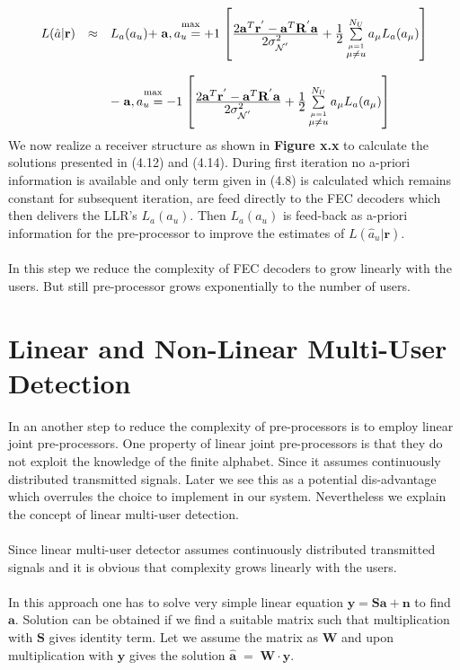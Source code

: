\begin{eqnarray}
\begin{array}{lll}
L(\hat{a}\vert \mathrm{\mathbf{r}})&\approx& L_a(a_u)
+\stackrel{\mathrm{max}}{\mathrm{\mathbf{a}},a_u=+1}\left[ \frac{\hbox{$2\mathrm{\mathbf{a}}^T\mathrm{\mathbf{r}}^{'}-\mathrm{\mathbf{a}}^T\mathrm{\mathbf{R}}^{'}\mathrm{\mathbf{a}}$}}{\hbox{$2\sigma^2_{\mathcal{N}^{'}}$}}+\frac{\hbox{$1$}}{\hbox{$2$}} \sum\limits_{\stackrel{\mu=1}{\mu \ne u}}^{N_U}a_{\mu}L_a(a_\mu) \right] \\ \\
&&-\stackrel{\mathrm{max}}{\mathrm{\mathbf{a}},a_u=-1}\left[ \frac{\hbox{$2\mathrm{\mathbf{a}}^T\mathrm{\mathbf{r}}^{'}-\mathrm{\mathbf{a}}^T\mathrm{\mathbf{R}}^{'}\mathrm{\mathbf{a}}$}}{\hbox{$2\sigma^2_{\mathcal{N}^{'}}$}}+\frac{\hbox{$1$}}{\hbox{$2$}} \sum\limits_{\stackrel{\mu=1}{\mu \ne u}}^{N_U}a_{\mu}L_a(a_\mu) \right]
\end{array}
\end{eqnarray}
We now realize a receiver structure as shown in \textbf{Figure x.x} to calculate the solutions presented in (4.12) and (4.14). During first iteration no a-priori information is available and only term given in (4.8) is calculated which remains constant for subsequent iteration, are feed directly to the FEC decoders which then delivers the LLR's $L_a(a_u)$. Then $L_a(a_u)$ is feed-back as a-priori information for the pre-processor to improve the estimates of $L(\hat{a}_u\vert \mathrm{\mathbf{r}})$. \\ \\
In this step we reduce the complexity of FEC decoders to grow linearly with the users. But still pre-processor grows exponentially to the number of users.
\section{Linear and Non-Linear Multi-User Detection}
In an another step to reduce the complexity of pre-processors is to employ linear joint pre-processors. One property of linear joint pre-processors is that they do not exploit the knowledge of the finite alphabet. Since it assumes continuously distributed transmitted signals. Later we see this as a potential dis-advantage which overrules the choice to implement in our system. Nevertheless we explain the concept of linear multi-user detection. \\ \\
Since linear multi-user detector assumes continuously distributed transmitted signals and it is obvious that complexity grows linearly with the users. \\ \\
In this approach one has to solve very simple linear equation $\mathrm{\mathbf{y}}=\mathrm{\mathbf{S}}\mathrm{\mathbf{a}}+\mathrm{\mathbf{n}}$ to find $\mathrm{\mathbf{a}}$. Solution can be obtained if we find a suitable matrix such that multiplication with $\mathrm{\mathbf{S}}$ gives identity term. Let we assume the matrix as $\mathrm{\mathbf{W}}$ and upon multiplication with $\mathrm{\mathbf{y}}$ gives the solution $\mathrm{\mathbf{\hat{a}}}\;=\;\mathrm{\mathbf{W}}\cdot\mathrm{\mathbf{y}}$.
